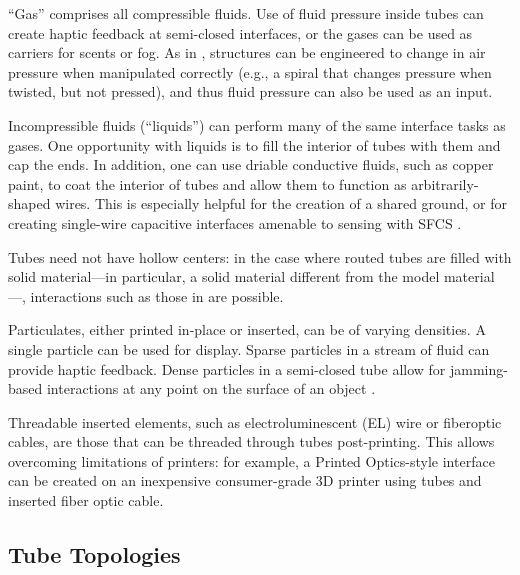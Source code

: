 ``Gas'' comprises all compressible fluids.  Use of fluid pressure inside tubes can create haptic feedback at semi-closed interfaces, or the gases can be used as carriers for scents or fog.  As in \cite{Slyper-pressure}, structures can be engineered to change in air pressure when manipulated correctly (e.g., a spiral that changes pressure when twisted, but not pressed), and thus fluid pressure can also be used as an input. 

Incompressible fluids (``liquids'') can perform many of the same interface tasks as gases.  One opportunity with liquids is to fill the interior of tubes with them and cap the ends.  In addition, one can use driable conductive fluids, such as copper paint, to coat the interior of tubes and allow them to function as arbitrarily-shaped wires.  This is especially helpful for the creation of a shared ground, or for creating single-wire capacitive interfaces amenable to sensing with SFCS \cite{Sato-touche}.

Tubes need not have hollow centers: in the case where routed tubes are filled with solid material---in particular, a solid material different from the model material---, interactions such as those in \cite{Willis-printedoptics} are possible.

Particulates, either printed in-place or inserted, can be of varying densities.  A single particle can be used for display.  Sparse particles in a stream of fluid can provide haptic feedback.  Dense particles in a semi-closed tube allow for jamming-based interactions at any point on the surface of an object \cite{Follmer-jamming}.

Threadable inserted elements, such as electroluminescent (EL) wire or fiberoptic cables, are those that can be threaded through tubes post-printing.  This allows overcoming limitations of printers: for example, a Printed Optics-style interface can be created on an inexpensive consumer-grade 3D printer using tubes and inserted fiber optic cable.

\subsection{Tube Topologies}

